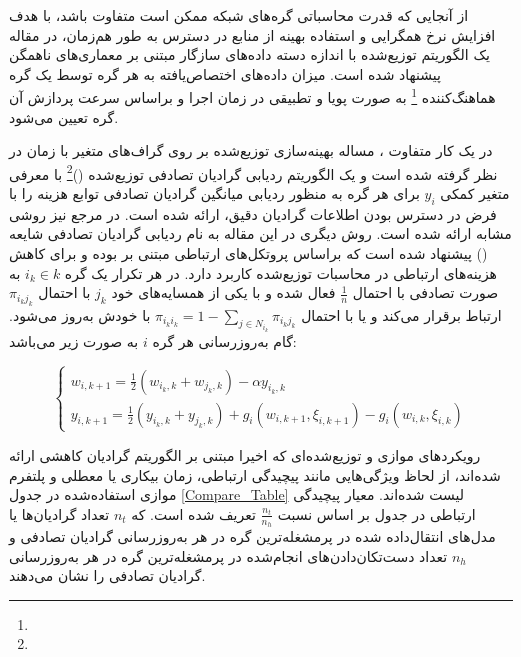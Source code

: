 از آنجایی که قدرت محاسباتی گره‌های شبکه ممکن است متفاوت باشد، با هدف افزایش نرخ همگرایی و استفاده بهینه از منابع در دسترس به طور هم‌زمان، در مقاله \cite{Ma2021} یک الگوریتم‌  توزیع‌شده با اندازه‌‌ دسته داده‌های سازگار  مبتنی بر معماری‌های ناهمگن   پیشنهاد شده است. میزان داده‌های اختصاص‌یافته به هر گره توسط یک گره هماهنگ‌کننده \footnote{} به صورت پویا و تطبیقی در زمان اجرا و براساس سرعت پردازش آن گره تعیین می‌شود. 

در یک کار متفاوت \cite{Pu2021}، مساله بهینه‌سازی توزیع‌شده بر روی گراف‌های متغیر با زمان در نظر گرفته‌ شده است و یک الگوریتم ردیابی گرادیان تصادفی توزیع‌شده ()\footnote{}  با معرفی متغیر کمکی $y_i$  برای هر گره به منظور ردیابی میانگین گرادیان تصادفی توابع هزینه را با فرض در دسترس بودن اطلاعات گرادیان دقیق، ارائه شده‌ است. در مرجع \cite{time2017} نیز روشی مشابه ارائه شده است. روش دیگری در این مقاله  \cite{Pu2021} به نام ردیابی گرادیان تصادفی شایعه ()  پیشنهاد شده است که براساس پروتکل‌های ارتباطی مبتنی بر  بوده و برای کاهش هزینه‌های ارتباطی در محاسبات توزیع‌شده کاربرد دارد. در هر تکرار یک گره‌ $i_k\in k$ به صورت تصادفی با احتمال $\frac{1}{n}$ فعال شده و با یکی از همسایه‌های خود $j_k$ با احتمال $\pi_{i_k j_k}$ ارتباط برقرار می‌کند و یا با احتمال $\pi_{i_k i_k}=1-\sum_{j\in N_{i_k}}\pi_{i_k j_k}$  با خودش به‌روز می‌شود. گام به‌روزرسانی هر گره $i$ به صورت زیر می‌باشد:

\begin{equation}\label{e27}
	\begin{cases}
		w_{i,k+1}=\frac{1}{2}(w_{i_k,k}+w_{j_k,k})-\alpha y_{i_k,k}\\
		y_{i,k+1}=\frac{1}{2}(y_{i_k,k}+y_{j_k,k})+g_i(w_{i,k+1},\xi_{i,k+1})-g_i(w_{i,k},\xi_{i,k})
	\end{cases}
\end{equation}

رویکرد‌های موازی و توزیع‌شده‌ای که اخیرا مبتنی بر الگوریتم گرادیان کاهشی ارائه شده‌اند، از لحاظ ویژگی‌هایی مانند پیچیدگی ارتباطی، زمان بیکاری یا معطلی و پلتفرم موازی استفاده‌شده در جدول \ref{Compare_Table} لیست شده‌اند. معیار پیچیدگی ارتباطی در جدول بر اساس نسبت $\frac{n_t}{n_h}$ تعریف شده است. که $n_t$ تعداد گرادیان‌ها یا مدل‌های انتقال‌داده‌ شده در پرمشغله‌ترین گره در هر  به‌روزرسانی گرادیان تصادفی و $n_h$ تعداد دست‌تکان‌دادن‌های انجام‌شده در پرمشغله‌ترین گره در هر  به‌روزرسانی گرادیان تصادفی را نشان می‌دهند. 

